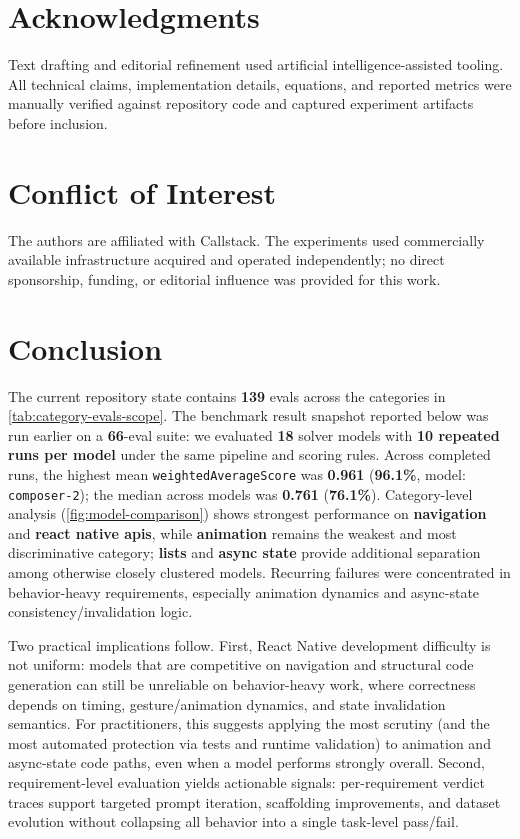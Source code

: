 \documentclass[11pt]{article}
\begin{document}
\section{Acknowledgments}

Text drafting and editorial refinement used artificial intelligence-assisted tooling. All technical claims, implementation details, equations, and reported metrics were manually verified against repository code and captured experiment artifacts before inclusion.

\section{Conflict of Interest}

The authors are affiliated with Callstack. The experiments used commercially available infrastructure acquired and operated independently; no direct sponsorship, funding, or editorial influence was provided for this work.

\section{Conclusion}
The current repository state contains \textbf{139} evals across the categories in \cref{tab:category-evals-scope}. The benchmark result snapshot reported below was run earlier on a \textbf{66}-eval suite: we evaluated \textbf{18} solver models with \textbf{10 repeated runs per model} under the same pipeline and scoring rules. Across completed runs, the highest mean \texttt{weightedAverageScore} was \textbf{0.961} (\textbf{96.1\%}, model: \texttt{composer-2}); the median across models was \textbf{0.761} (\textbf{76.1\%}). Category-level analysis (\cref{fig:model-comparison}) shows strongest performance on \textbf{navigation} and \textbf{react native apis}, while \textbf{animation} remains the weakest and most discriminative category; \textbf{lists} and \textbf{async state} provide additional separation among otherwise closely clustered models. Recurring failures were concentrated in behavior-heavy requirements, especially animation dynamics and async-state consistency/invalidation logic.

Two practical implications follow. First, React Native development difficulty is not uniform: models that are competitive on navigation and structural code generation can still be unreliable on behavior-heavy work, where correctness depends on timing, gesture/animation dynamics, and state invalidation semantics. For practitioners, this suggests applying the most scrutiny (and the most automated protection via tests and runtime validation) to animation and async-state code paths, even when a model performs strongly overall. Second, requirement-level evaluation yields actionable signals: per-requirement verdict traces support targeted prompt iteration, scaffolding improvements, and dataset evolution without collapsing all behavior into a single task-level pass/fail.
\end{document}
